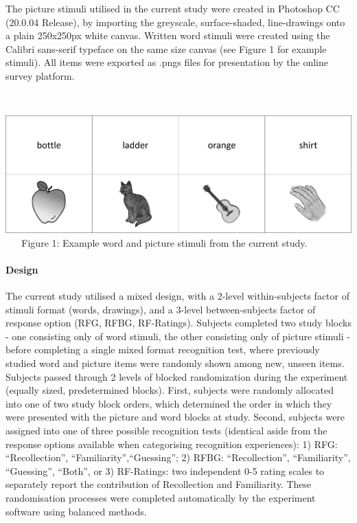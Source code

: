 \documentclass[
  11pt,
]{article}
\begin{document}
The picture stimuli utilised in the current study were created in
Photoshop CC (20.0.04 Release), by importing the greyscale,
surface-shaded, line-drawings onto a plain 250x250px white canvas.
Written word stimuli were created using the Calibri sans-serif typeface
on the same size canvas (see Figure 1 for example stimuli). All items
were exported as .pngs files for presentation by the online survey
platform.

~ ~

\includegraphics[width=1\linewidth]{./resources/images/exp1__stim_examples}
~ ~ Figure 1: Example word and picture stimuli from the current study. ~
~

\hypertarget{design}{%
\paragraph{Design}\label{design}}

The current study utilised a mixed design, with a 2-level
within-subjects factor of stimuli format (words, drawings), and a
3-level between-subjects factor of response option (RFG, RFBG,
RF-Ratings). Subjects completed two study blocks - one consisting only
of word stimuli, the other consisting only of picture stimuli - before
completing a single mixed format recognition test, where previously
studied word and picture items were randomly shown among new, unseen
items. Subjects passed through 2 levels of blocked randomization during
the experiment (equally sized, predetermined blocks). First, subjects
were randomly allocated into one of two study block orders, which
determined the order in which they were presented with the picture and
word blocks at study. Second, subjects were assigned into one of three
possible recognition tests (identical aside from the response options
available when categorising recognition experiences): 1) RFG:
``Recollection'', ``Familiarity'',``Guessing''; 2) RFBG:
``Recollection'', ``Familiarity'', ``Guessing'', ``Both'', or 3)
RF-Ratings: two independent 0-5 rating scales to separately report the
contribution of Recollection and Familiarity. These randomisation
processes were completed automatically by the experiment software using
balanced methods.
\end{document}
